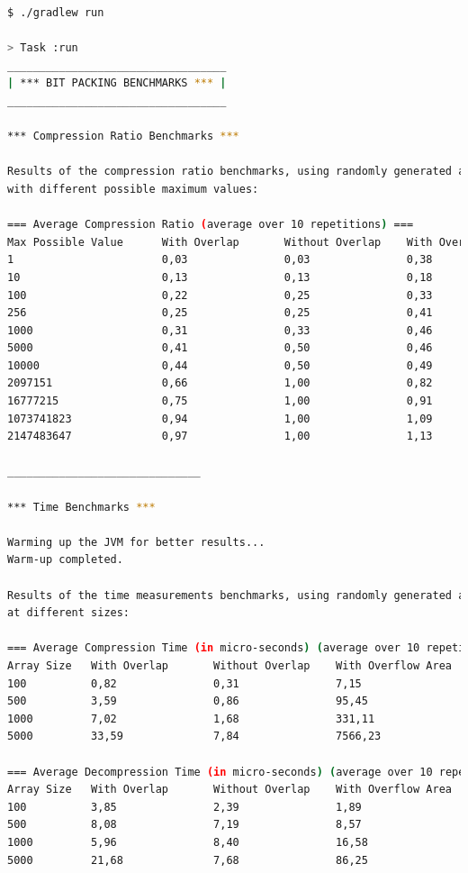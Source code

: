 \documentclass[titlepage]{article}
\begin{document}
\begin{lstlisting}[language=Bash] 
$ ./gradlew run                

> Task :run
__________________________________
| *** BIT PACKING BENCHMARKS *** |
__________________________________

*** Compression Ratio Benchmarks ***

Results of the compression ratio benchmarks, using randomly generated arrays
with different possible maximum values:

=== Average Compression Ratio (average over 10 repetitions) ===
Max Possible Value      With Overlap       Without Overlap    With Overflow Area
1                       0,03               0,03               0,38              
10                      0,13               0,13               0,18              
100                     0,22               0,25               0,33              
256                     0,25               0,25               0,41              
1000                    0,31               0,33               0,46              
5000                    0,41               0,50               0,46              
10000                   0,44               0,50               0,49              
2097151                 0,66               1,00               0,82              
16777215                0,75               1,00               0,91              
1073741823              0,94               1,00               1,09              
2147483647              0,97               1,00               1,13              

______________________________

*** Time Benchmarks ***

Warming up the JVM for better results...
Warm-up completed.

Results of the time measurements benchmarks, using randomly generated arrays
at different sizes:

=== Average Compression Time (in micro-seconds) (average over 10 repetitions) ===
Array Size   With Overlap       Without Overlap    With Overflow Area
100          0,82               0,31               7,15              
500          3,59               0,86               95,45             
1000         7,02               1,68               331,11            
5000         33,59              7,84               7566,23           

=== Average Decompression Time (in micro-seconds) (average over 10 repetitions) ===
Array Size   With Overlap       Without Overlap    With Overflow Area
100          3,85               2,39               1,89              
500          8,08               7,19               8,57              
1000         5,96               8,40               16,58             
5000         21,68              7,68               86,25             


\end{lstlisting}
\end{document}
